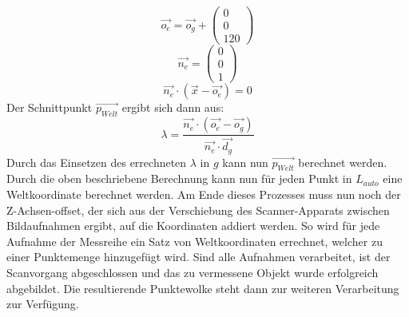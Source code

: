 \begin{equation}
\vec{o_{e}} = \vec{o_{g}} + \left(\begin{array}{c}0\\0\\120\end{array}\right)
\end{equation}
\begin{equation}
\vec{n_{e}} = \left(\begin{array}{c}0\\0\\1\end{array}\right)
\end{equation}
\begin{equation}
\vec{n_{e}} \cdot (\vec{x} - \vec{o_{e}}) = 0
\end{equation}
Der Schnittpunkt \(\vec{p_{Welt}}\) ergibt sich dann aus:
\begin{equation}
\lambda = \frac{\vec{n_{e}} \cdot ( \vec{o_{e}} - \vec{o_{g}} ) }{ \vec{n_{e}} \cdot \vec{d_{g} }}
\end{equation}
Durch das Einsetzen des errechneten \(\lambda\) in \(g\) kann nun \(\vec{p_{Welt}}\) berechnet werden. \bigbreak
Durch die oben beschriebene Berechnung kann nun für jeden Punkt in \(L_{auto}\) eine Weltkoordinate berechnet werden. Am Ende dieses Prozesses muss nun noch der Z-Achsen-offset, der sich aus der Verschiebung des Scanner-Apparats zwischen Bildaufnahmen ergibt, auf die Koordinaten addiert werden. So wird für jede Aufnahme der Messreihe ein Satz von Weltkoordinaten errechnet, welcher zu einer Punktemenge hinzugefügt wird. Sind alle Aufnahmen verarbeitet, ist der Scanvorgang abgeschlossen und das zu vermessene Objekt wurde erfolgreich abgebildet. Die resultierende Punktewolke steht dann zur weiteren Verarbeitung zur Verfügung.

